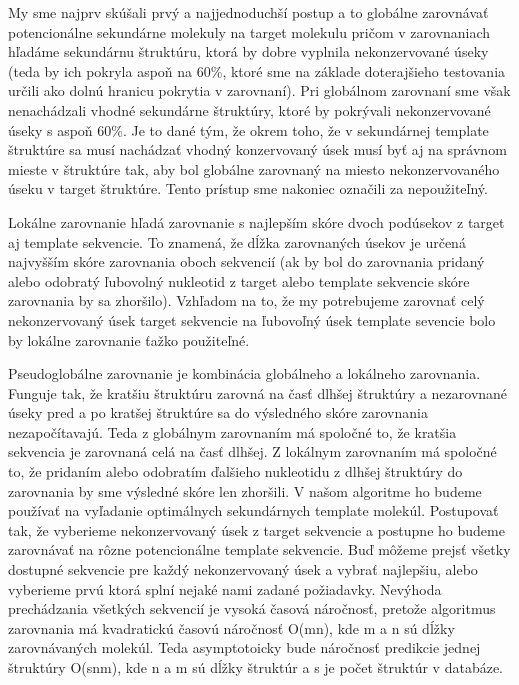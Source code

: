 \indent My sme najprv skúšali prvý a najjednoduchší postup a to globálne zarovnávať potencionálne sekundárne molekuly na target molekulu pričom v zarovnaniach hľadáme sekundárnu štruktúru, ktorá by dobre vyplnila nekonzervované úseky (teda by ich pokryla aspoň na 60\%, ktoré sme na základe doterajšieho testovania určili ako dolnú hranicu pokrytia v zarovnaní). Pri globálnom zarovnaní sme však nenachádzali vhodné sekundárne štruktúry, ktoré by pokrývali nekonzervované úseky s aspoň 60\%. Je to dané tým, že okrem toho, že v sekundárnej template štruktúre sa musí nachádzať vhodný konzervovaný úsek musí byť aj na správnom mieste v štruktúre tak, aby bol globálne zarovnaný na miesto nekonzervovaného úseku v target štruktúre. Tento prístup sme nakoniec označili za nepoužiteľný.


\indent Lokálne zarovnanie hľadá zarovnanie s najlepším skóre dvoch podúsekov z target aj template sekvencie. To znamená, že dĺžka zarovnaných úsekov je určená najvyšším skóre zarovnania oboch sekvencií (ak by bol do zarovnania pridaný alebo odobratý ľubovolný nukleotid z target alebo template sekvencie skóre zarovnania by sa zhoršilo). Vzhľadom na to, že my potrebujeme zarovnať celý nekonzervovaný úsek target sekvencie na ľubovoľný úsek template sevencie bolo by lokálne zarovnanie ťažko použiteľné.


\indent Pseudoglobálne zarovnanie je kombinácia globálneho a lokálneho zarovnania. Funguje tak, že kratšiu štruktúru zarovná na časť dlhšej štruktúry a nezarovnané úseky pred a po kratšej štruktúre sa do výsledného skóre zarovnania nezapočítavajú. Teda z globálnym zarovnaním má spoločné to, že kratšia sekvencia je zarovnaná celá na časť dlhšej. Z lokálnym zarovnaním má spoločné to, že pridaním alebo odobratím ďalšieho nukleotidu z dlhšej štruktúry do zarovnania by sme výsledné skóre len zhoršili. V našom algoritme ho budeme používať na vyľadanie optimálnych sekundárnych template molekúl. Postupovať tak, že vyberieme nekonzervovaný úsek z target sekvencie a postupne ho budeme zarovnávať na rôzne potencionálne template sekvencie. Buď môžeme prejsť všetky dostupné sekvencie pre každý nekonzervovaný úsek a vybrať najlepšiu, alebo vyberieme prvú ktorá splní nejaké nami zadané požiadavky. Nevýhoda prechádzania všetkých sekvencií je vysoká časová náročnosť, pretože algoritmus zarovnania má kvadratickú časovú náročnosť O(mn), kde m a n sú dĺžky zarovnávaných molekúl. Teda asymptotoicky bude náročnosť predikcie jednej štruktúry O(snm), kde n a m sú dĺžky štruktúr a s je počet štruktúr v databáze. 


